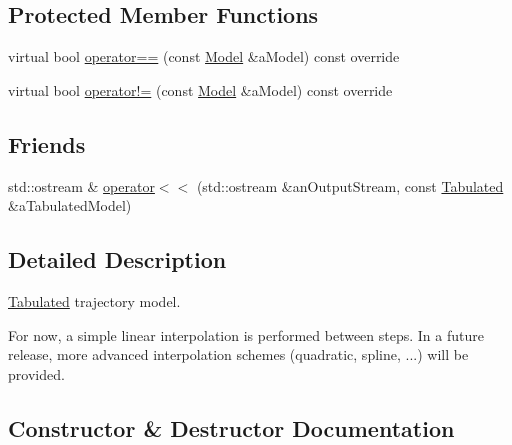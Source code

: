 \subsection*{Protected Member Functions}
\begin{DoxyCompactItemize}
\item 
virtual bool \hyperlink{classostk_1_1astro_1_1trajectory_1_1models_1_1_tabulated_a9d206aee35ebabe4b36ddfc057142f16}{operator==} (const \hyperlink{classostk_1_1astro_1_1trajectory_1_1_model}{Model} \&a\+Model) const override
\item 
virtual bool \hyperlink{classostk_1_1astro_1_1trajectory_1_1models_1_1_tabulated_a5e047165eb79ea50d257c2cb1bafc30d}{operator!=} (const \hyperlink{classostk_1_1astro_1_1trajectory_1_1_model}{Model} \&a\+Model) const override
\end{DoxyCompactItemize}
\subsection*{Friends}
\begin{DoxyCompactItemize}
\item 
std\+::ostream \& \hyperlink{classostk_1_1astro_1_1trajectory_1_1models_1_1_tabulated_af2b779226be02822defbe40cf6d3c4b8}{operator$<$$<$} (std\+::ostream \&an\+Output\+Stream, const \hyperlink{classostk_1_1astro_1_1trajectory_1_1models_1_1_tabulated}{Tabulated} \&a\+Tabulated\+Model)
\end{DoxyCompactItemize}


\subsection{Detailed Description}
\hyperlink{classostk_1_1astro_1_1trajectory_1_1models_1_1_tabulated}{Tabulated} trajectory model. 

For now, a simple linear interpolation is performed between steps. In a future release, more advanced interpolation schemes (quadratic, spline, ...) will be provided. 

\subsection{Constructor \& Destructor Documentation}
\mbox{\label{classostk_1_1astro_1_1trajectory_1_1models_1_1_tabulated_a789aab702a52091467869fb78018b37d}} 
